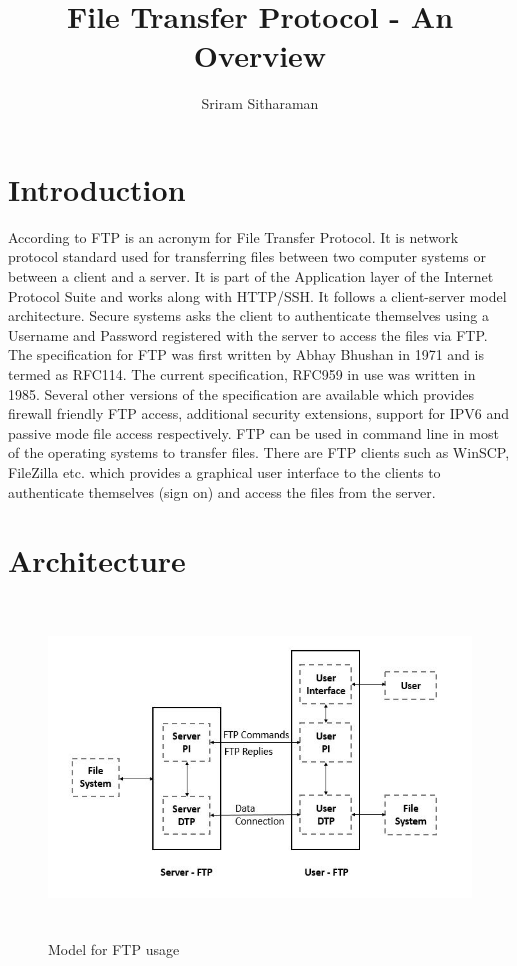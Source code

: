 \documentclass[9pt,twocolumn,twoside]{styles/osajnl}
\title{File Transfer Protocol - An Overview}
\author[1,*]{Sriram Sitharaman}
\affil[1]{School of Informatics and Computing, Bloomington, IN 47408, U.S.A.}
\affil[*]{Corresponding authors: srirsith@iu.edu}
\begin{document}
\maketitle
\tableofcontents %
\section{Introduction}
According to \cite{www-wiki-ftp} FTP is an acronym for File Transfer Protocol. It is network protocol standard used for transferring files between two computer systems or between a client and a server. It is part of the Application layer of the Internet Protocol Suite and works along with HTTP/SSH. It follows a client-server model architecture. Secure systems asks the client to authenticate themselves using a Username and Password registered with the server to access the files via FTP. The specification for FTP was first written by  Abhay Bhushan \cite{www-rfc114} in 1971 and is termed as RFC114. The current specification, RFC959 in use was written in 1985. Several other versions of the specification are available which provides firewall friendly FTP access, additional security extensions, support for IPV6 and passive mode file access respectively. FTP can be used in command line in most of the operating systems to transfer files. There are FTP clients such as WinSCP, FileZilla etc. which provides a graphical user interface to the clients to authenticate themselves (sign on) and access the files from the server.


\section{Architecture}

\begin{figure}[hbt]
\begin{center}
\centering
\includegraphics[width =6in ,height=3.5in]{images/Architecture}
\caption{Model for FTP usage}
\end{center}
\end{figure}
\end{document}
